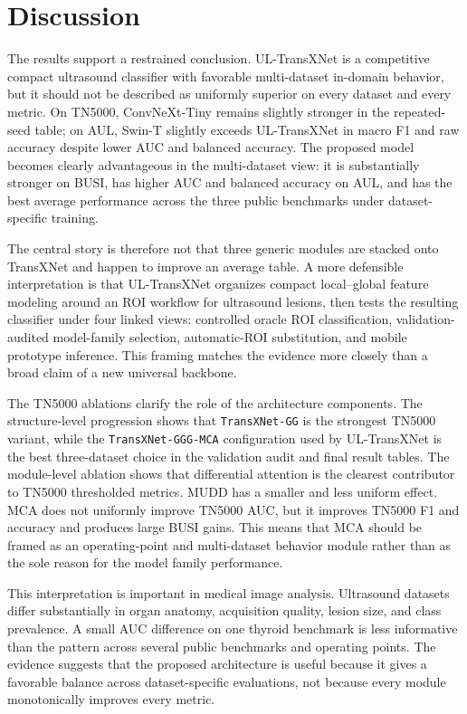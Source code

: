 \section{Discussion}
\label{sec:discussion}
The results support a restrained conclusion. UL-TransXNet is a competitive compact ultrasound classifier with favorable multi-dataset in-domain behavior, but it should not be described as uniformly superior on every dataset and every metric. On TN5000, ConvNeXt-Tiny remains slightly stronger in the repeated-seed table; on AUL, Swin-T slightly exceeds UL-TransXNet in macro F1 and raw accuracy despite lower AUC and balanced accuracy. The proposed model becomes clearly advantageous in the multi-dataset view: it is substantially stronger on BUSI, has higher AUC and balanced accuracy on AUL, and has the best average performance across the three public benchmarks under dataset-specific training.

The central story is therefore not that three generic modules are stacked onto TransXNet and happen to improve an average table. A more defensible interpretation is that UL-TransXNet organizes compact local--global feature modeling around an ROI workflow for ultrasound lesions, then tests the resulting classifier under four linked views: controlled oracle ROI classification, validation-audited model-family selection, automatic-ROI substitution, and mobile prototype inference. This framing matches the evidence more closely than a broad claim of a new universal backbone.

The TN5000 ablations clarify the role of the architecture components. The structure-level progression shows that \texttt{TransXNet-GG} is the strongest TN5000 variant, while the \texttt{TransXNet-GGG-MCA} configuration used by UL-TransXNet is the best three-dataset choice in the validation audit and final result tables. The module-level ablation shows that differential attention is the clearest contributor to TN5000 thresholded metrics. MUDD has a smaller and less uniform effect. MCA does not uniformly improve TN5000 AUC, but it improves TN5000 F1 and accuracy and produces large BUSI gains. This means that MCA should be framed as an operating-point and multi-dataset behavior module rather than as the sole reason for the model family performance.

This interpretation is important in medical image analysis. Ultrasound datasets differ substantially in organ anatomy, acquisition quality, lesion size, and class prevalence. A small AUC difference on one thyroid benchmark is less informative than the pattern across several public benchmarks and operating points. The evidence suggests that the proposed architecture is useful because it gives a favorable balance across dataset-specific evaluations, not because every module monotonically improves every metric.


